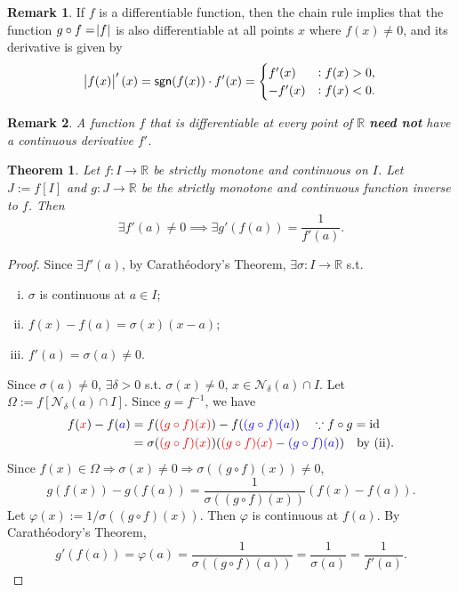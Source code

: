 \documentclass[12pt,openany]{book}
\newtheorem{theorem}{Theorem}[chapter]
\theoremstyle{definition}
\newtheorem{remark}{Remark}[chapter]
\newcommand{\R}{\mathbb{R}}
\newcommand{\nbhd}{\mathcal{N}}
\newcommand{\Id}{\operatorname{\textnormal{id}}}
\newcommand{\Caratheodroy}{Carath\'{e}odory}
\begin{document}
	\vspace{4pt}
	\begin{remark}
		If $f$ is a differentiable function, then the chain rule implies that the function $g\circ f=\abs{f}$ is also differentiable at all points $x$ where $f(x)\neq 0$, and its derivative is given by \[
		\abs{f(x)}'(x)=\mathsf{sgn}(f(x))\cdot f'(x)=\begin{cases}
			f'(x) &:f(x)>0,\\
			-f'(x) &:f(x)<0.
		\end{cases}
		\]
	\end{remark}
	\vspace{4pt}
	\begin{remark}\it
		A function $f$ that is differentiable at every point of $\R$ \textbf{need not} have a continuous derivative $f'$.
	\end{remark}
	
	\newpage
	\begin{tcolorbox}[colback=white,colframe=thmcolor,arc=5pt,title={\color{white}\bf Differentiablility of The Inverse Function}]
		\begin{theorem}
			Let $f:I\to\R$ be strictly monotone and continuous on $I$. Let $J:=f[I]$ and $g:J\to\R$ be the strictly monotone and continuous function inverse to $f$. Then \[
			\exists f'(a)\neq 0\implies\exists g'(f(a))=\frac{1}{f'(a)}.
			\]
		\end{theorem}
	\end{tcolorbox}
	\begin{proof}
		Since $\exists f'(a)$, by \Caratheodroy's Theorem, $\exists\sigma:I\to\R$ s.t. \begin{enumerate}[(i)]
			\item $\sigma$ is continuous at $a\in I$;
			\item $f(x)-f(a)=\sigma(x)(x-a)$;
			\item $f'(a)=\sigma(a)\neq 0$.
		\end{enumerate} Since $\sigma(a)\neq 0$, $\exists\delta>0$ s.t. $\sigma(x)\neq0$, $x\in\nbhd_\delta(a)\cap I$.
		Let $\Omega:=f[\nbhd_\delta(a)\cap I]$. Since $g=f^{-1}$, we have \begin{align*}
			f(\textcolor{red}{x})-f(\textcolor{blue}{a})&=f(\textcolor{red}{(g\circ f)(x)})-f(\textcolor{blue}{(g\circ f)(a)})\quad\because f\circ g=\Id\\
			&=\sigma(\textcolor{red}{(g\circ f)(x)})(\textcolor{red}{(g\circ f)(x)}-\textcolor{blue}{(g\circ f)(a)})\quad\text{by (ii)}.
		\end{align*} Since $f(x)\in\Omega\Rightarrow\sigma(x)\neq 0\Rightarrow \sigma((g\circ f)(x))\neq 0$, \[
		g(f(x))-g(f(a))=\frac{1}{\sigma((g\circ f)(x))}(f(x)-f(a)).
		\] Let $\varphi(x):=1/\sigma((g\circ f)(x))$. Then $\varphi$ is continuous at $f(a)$. By \Caratheodroy's Theorem, \[
		g'(f(a))=\varphi(a)=\frac{1}{\sigma((g\circ f)(a))}=\frac{1}{\sigma(a)}=\frac{1}{f'(a)}.
		\]
	\end{proof}
	
\end{document}
